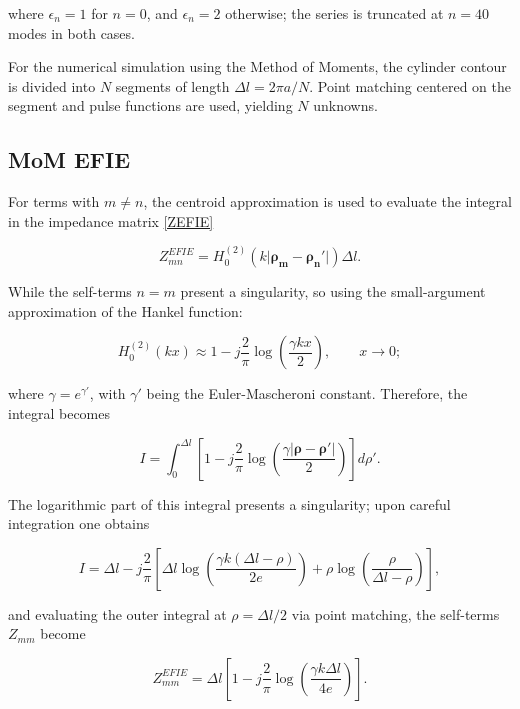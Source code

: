 \documentclass[11pt,a4paper,twoside,pdf]{article}
\numberwithin{equation}{section}
\begin{document}
where $\epsilon_n = 1$ for $n = 0$, and $\epsilon_n = 2$ otherwise; the series is truncated at $n = 40$ modes in both cases.

For the numerical simulation using the Method of Moments, the cylinder contour is divided into $N$ segments of length $\Delta l = 2\pi a / N$. Point matching centered on the segment and pulse functions are used, yielding $N$ unknowns.


\subsection{MoM EFIE}
\label{efienum}

For terms with $m \neq n$, the centroid approximation is used to evaluate the integral in the impedance matrix \ref{ZEFIE}

$$
    Z^{EFIE}_{mn} =  H_0^{(2)}\!\left( k \lvert \boldsymbol{\rho_m} - \boldsymbol{\rho_n}' \rvert \right) \Delta l.
$$

While the self-terms $n=m$ present a singularity, so using the small-argument approximation of the Hankel function:

\begin{equation}
H_0^{(2)}(k x)
\approx
1
-
j \frac{2}{\pi}
\log\!\left( \frac{\gamma k x}{2} \right),
\qquad x \to 0;
\end{equation}

where $\gamma = e^{\gamma'}$, with $\gamma'$ being the Euler-Mascheroni constant. Therefore, the integral becomes

\begin{equation}
I
=
\int_0^{\Delta l}
\left[
1
-
j \frac{2}{\pi}
\log\!\left(
\frac{\gamma |\boldsymbol{\rho} - \boldsymbol{\rho'}|}{2}
\right)
\right]
d\rho'.
\end{equation}

The logarithmic part of this integral presents a singularity; upon careful integration one obtains

\begin{equation}
I
=
\Delta l
-
j \frac{2}{\pi}
\left[
\Delta l
\log\!\left(
\frac{\gamma k (\Delta l - \rho)}{2 e}
\right)
+
\rho
\log\!\left(
\frac{\rho}{\Delta l - \rho}
\right)
\right],
\end{equation}

and evaluating the outer integral at $\rho = \Delta l / 2$ via point matching, the self-terms $Z_{mm}$ become

\begin{equation}
Z^{EFIE}_{mm}
=
\Delta l
\left[
1
-
j \frac{2}{\pi}
\log\!\left(
\frac{\gamma k \Delta l}{4e}
\right)
\right].
\end{equation}
\end{document}
